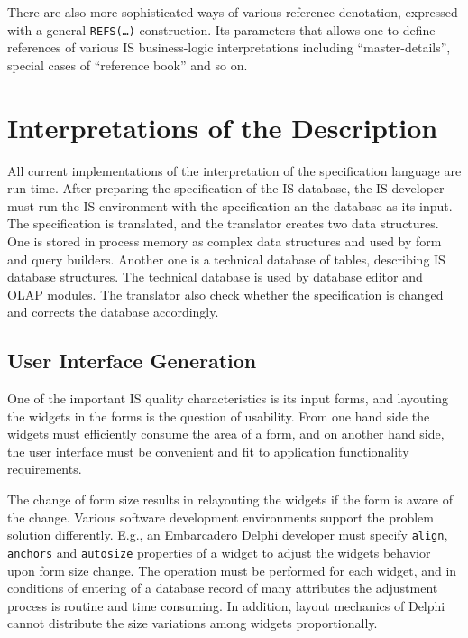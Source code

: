 \documentclass[conference]{IEEEtran}
\begin{document}
There are also more sophisticated ways of various reference denotation, expressed with a general \texttt{REFS(\ldots)} construction.  Its parameters that allows one to define references of various IS business-logic interpretations including ``master-details'', special cases of ``reference book'' and so on.

\section{Interpretations of the Description}
\label{sec:interpr-descr}

All current implementations of the interpretation of the specification language are run time.  After preparing the specification of the IS database, the IS developer must run the IS environment with the specification an the database as its input.  The specification is translated, and the translator creates two data structures.  One is stored in process memory as complex data structures and used by form and query builders.  Another one is a technical database of tables, describing IS database structures.  The technical database is used by database editor and OLAP modules.  The translator also check whether the specification is changed and corrects the database accordingly.

\subsection{User Interface Generation}
\label{sec:user-interace-form}
One of the important IS quality characteristics is its input forms, and layouting the widgets in the forms is the question of usability.  From one hand side the widgets must efficiently consume the area of a form, and on another hand side, the user interface must be convenient and fit to  application functionality requirements.

The change of form size results in relayouting the widgets if the form is aware of the change.  Various software development environments support the problem solution differently.  E.g., an Embarcadero Delphi developer must specify \texttt{align}, \texttt{anchors} and \texttt{autosize} properties of a widget to adjust the widgets behavior upon form size change.  The operation must be performed for each widget, and in conditions of entering of a database record of many attributes the adjustment process is routine and time consuming.  In addition, layout mechanics of Delphi cannot distribute the size variations among widgets proportionally.
\end{document}
